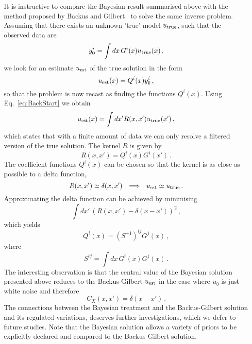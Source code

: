 It is instructive to compare the Bayesian result summarised above with the
method proposed by Backus and Gilbert~\cite{BackusGilbert1968} to solve the same
inverse problem. Assuming that there exists an unknown 'true' model $u_\mathrm{true}$,
such that the observed data are
\begin{equation}
  \label{eq:BackStart}
  y_0^i = \int dx\, G^i(x) u_\mathrm{true}(x)\, ,
\end{equation}
we look for an estimate $u_\mathrm{est}$ of the true solution in the form
\begin{equation}
  \label{eq:BackAnsatz}
  u_\mathrm{est}(x) = Q^i(x) y^i_0\, ,
\end{equation}
so that the problem is now recast as finding the functions $Q^i(x)$.
Using Eq.~\ref{eq:BackStart} we obtain
\begin{equation}
  \label{eq:BackFilter}
  u_\mathrm{est}(x) = \int dx' R(x,x') u_\mathrm{true}(x')\, , 
\end{equation}
which states that with a finite amount of data we can only resolve a filtered
version of the true solution. The kernel $R$ is given by
\begin{equation}
  \label{eq:BackKernel}
  R(x,x') = Q^i(x) G^i(x')\, .
\end{equation}
The coefficient functions $Q^i(x)$ can be chosen so that the kernel is as close as possible
to a delta function,
\begin{equation}
  \label{eq:BackDelta}
  R(x,x') \simeq \delta(x,x') ~~ \Longrightarrow ~~
  u_\mathrm{est} \simeq u_\mathrm{true}\, .
\end{equation}
Approximating the delta function can be achieved by minimising 
\begin{equation}
  \label{eq:BackDeltaness}
  \int dx'\, \left(
    R(x,x') - \delta(x-x')
  \right)^2\, ,
\end{equation}
which yields
\begin{equation}
  \label{eq:BackSolution}
  Q^i(x) = \left(S^{-1}\right)^{ij} G^j(x)\, ,
\end{equation}
where 
\begin{equation}
  \label{eq:BackSMatrix}
  S^{ij} = \int dx\, G^i(x) G^j(x)\, .
\end{equation}
The interesting observation is that the central value of the Bayesian solution
presented above reduces to the Backus-Gilbert $u_\mathrm{est}$ in the case where $u_0$ 
is just white noise and therefore
\begin{equation}
  \label{eq:BackComparison}
  C_{X}(x,x') = \delta(x-x')\, .
\end{equation}
The connections between the Bayesian treatment and the Backus-Gilbert solution
and its regulated variations, deserves further investigations, which we defer to
future studies. Note that the Bayesian solution allows a variety of priors to be
explicitly declared and compared to the Backus-Gilbert solution. 